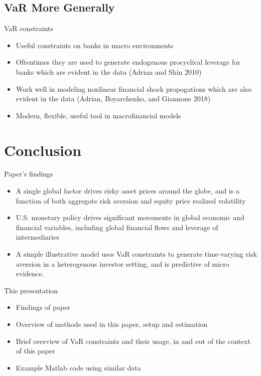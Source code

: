 \documentclass{beamer}
\begin{document}
\subsection{VaR More Generally}
\begin{frame}{VaR constraints}
\begin{itemize}
\item Useful constraints on banks in macro environments
\item Oftentimes they are used to generate endogenous procyclical leverage for banks which are evident in the data (Adrian and Shin 2010)
\item Work well in modeling nonlinear financial shock propogations which are also evident in the data (Adrian, Boyarchenko, and Giannone 2018)
\item Modern, flexible, useful tool in macrofinancial models
\end{itemize}
\end{frame}
\section{Conclusion}
\begin{frame}{Paper's findings}
\begin{itemize}
\item A single global factor drives risky asset prices around the globe, and is a function of both aggregate risk aversion and equity price realized volatility
\item U.S. monetary policy drives significant movements in global economic and financial variables, including global financial flows and leverage of intermediaries
\item A simple illustrative model uses VaR constraints to generate time-varying risk aversion in a heterogenous investor setting, and is predictive of micro evidence.
\end{itemize}
\end{frame}

\begin{frame}{This presentation}
\begin{itemize}
\item Findings of paper
\item Overview of methods used in this paper, setup and estimation
\item Brief overview of VaR constraints and their usage, in and out of the context of this paper
\item Example Matlab code using similar data
\end{itemize}
\end{frame}
\fi
\end{document}
